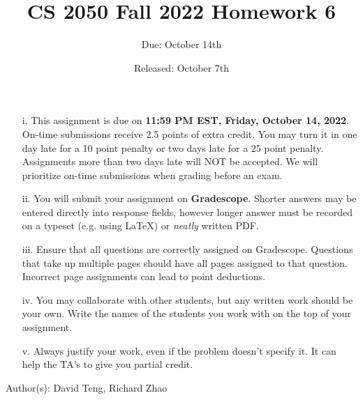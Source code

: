 \documentclass{article}
\title{CS 2050 Fall 2022 Homework 6}
\author{Due: October 14th}
\date{Released: October 7th}
\begin{document}
\maketitle

\begin{enumerate}
    \item[i.] This assignment is due on \textbf{11:59 PM EST, Friday, October 14, 2022}.  On-time submissions receive 2.5 points of extra credit. You may turn it in one day late for a 10 point penalty or two days late for a 25 point penalty. Assignments more than two days late will NOT be accepted.  We will prioritize on-time submissions when grading before an exam.
    \item[ii.] You will submit your assignment on \textbf{Gradescope}. Shorter answers may be entered directly into response fields, however longer answer must be recorded on a typeset (e.g. using \LaTeX) or \emph{neatly} written PDF.
    \item[iii.] Ensure that all questions are correctly assigned on Gradescope. Questions that take up multiple pages should have all pages assigned to that question. Incorrect page assignments can lead to point deductions.
    \item[iv.] You may collaborate with other students, but any written work should be your own. Write the names of the students you work with on the top of your assignment.
    \item[v.] Always justify your work, even if the problem doesn't specify it. It can help the TA's to give you partial credit.
\end{enumerate}

Author(s): David Teng, Richard Zhao

\clearpage
\end{document}
